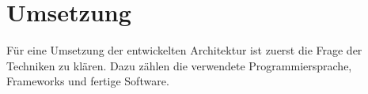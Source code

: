 \chapter{Umsetzung}

Für eine Umsetzung der entwickelten Architektur ist zuerst die Frage der Techniken zu klären.
Dazu zählen die verwendete Programmiersprache, Frameworks und fertige Software.






